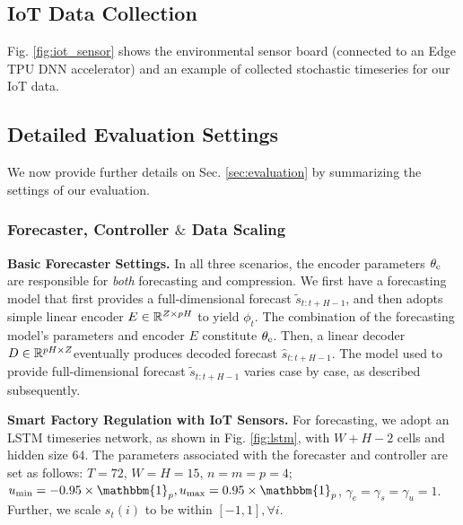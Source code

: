 

\subsection{IoT Data Collection}

Fig. \ref{fig:iot_sensor} shows the environmental sensor board (connected to an Edge TPU DNN accelerator) and an example of collected stochastic timeseries for our IoT data.

\subsection{Detailed Evaluation Settings}
\label{sec:appendix_evaluation}


We now provide further details on Sec. \ref{sec:evaluation} by summarizing the settings of our evaluation.

\subsubsection{Forecaster, Controller $\&$ Data Scaling}

\textbf{Basic Forecaster Settings.} In all three scenarios, the encoder parameters $\theta_{\mathrm{e}}$ are responsible for \textit{both} forecasting and compression. We first have a forecasting model that first provides a full-dimensional forecast $\tilde{s}_{t:t+H-1}$, and then adopts simple linear encoder $E \in \mathbb{R}^{Z \times pH}$ to yield $\phi_t$. The combination of the forecasting model's parameters and encoder $E$ constitute $\theta_{\mathrm{e}}$. Then, a linear decoder $D \in \mathbb{R}^{pH \times Z}$eventually produces decoded forecast $\hat{s}_{t:t+H-1}$. The model used to provide full-dimensional forecast $\tilde{s}_{t:t+H-1}$ varies case by case, as described subsequently.

\textbf{Smart Factory Regulation with IoT Sensors.} For forecasting, we adopt an LSTM timeseries network, as shown in Fig. \ref{fig:lstm}, with $W+H-2$ cells and hidden size $64$. The parameters associated with the forecaster and controller are set as follows: $T=72$, $W = H = 15$, $n = m = p = 4$; $u_\text{min} = -0.95 \times \mathbbm{1}_{p}, u_\text{max} = 0.95 \times \mathbbm{1}_{p}$, $\gamma_e = \gamma_s = \gamma_u = 1$. Further, we scale $s_t(i)$ to be within $[-1, 1], \forall i$.

